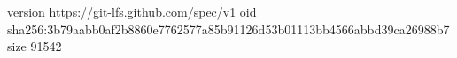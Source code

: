 version https://git-lfs.github.com/spec/v1
oid sha256:3b79aabb0af2b8860e7762577a85b91126d53b01113bb4566abbd39ca26988b7
size 91542
